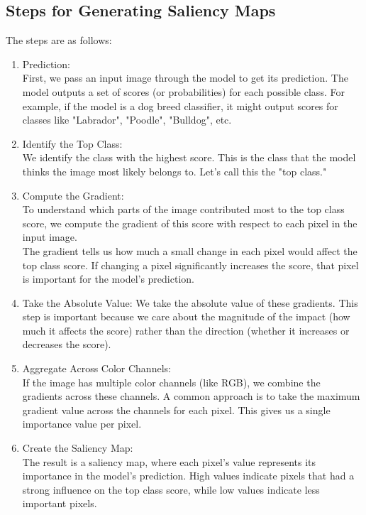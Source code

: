 \subsection{Steps for Generating Saliency Maps}
The steps are as follows: 
\begin{enumerate}
    \item Prediction:\\
    First, we pass an input image through the model to get its prediction. The model outputs a set of scores (or probabilities) for each possible class. For example, if the model is a dog breed classifier, it might output scores for classes like "Labrador", "Poodle", "Bulldog", etc.
    
    \item Identify the Top Class:\\
    We identify the class with the highest score. This is the class that the model thinks the image most likely belongs to. Let's call this the "top class."
    
    \item Compute the Gradient:\\
    To understand which parts of the image contributed most to the top class score, we compute the gradient of this score with respect to each pixel in the input image.\\
    The gradient tells us how much a small change in each pixel would affect the top class score. If changing a pixel significantly increases the score, that pixel is important for the model's prediction.
    
    \item Take the Absolute Value:
    We take the absolute value of these gradients. This step is important because we care about the magnitude of the impact (how much it affects the score) rather than the direction (whether it increases or decreases the score).
    
    \item Aggregate Across Color Channels:\\
    If the image has multiple color channels (like RGB), we combine the gradients across these channels. A common approach is to take the maximum gradient value across the channels for each pixel. This gives us a single importance value per pixel.
    
    \item Create the Saliency Map:\\
    The result is a saliency map, where each pixel's value represents its importance in the model's prediction. High values indicate pixels that had a strong influence on the top class score, while low values indicate less important pixels.
    
\end{enumerate}
\par\vspace{1em}


